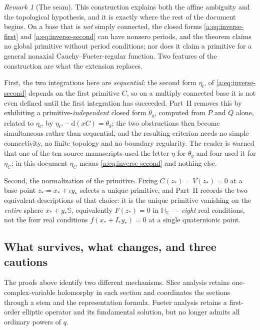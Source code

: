 \documentclass[11pt,a4paper]{article}
\numberwithin{equation}{section}
\theoremstyle{definition}
\theoremstyle{remark}
\newtheorem{remark}[theorem]{Remark}
\theoremstyle{plain}
\newcommand{\HC}{\mathbb H_{\mathbb C}}
\newcommand{\SSS}{\mathbb S}
\newcommand{\thet}{\theta}
\newcommand{\etaC}{\eta_{C}}
\newcommand{\pot}{C}          %
\newcommand{\potV}{V}         %
\newcommand{\dd}{\mathrm d}
\begin{document}
\begin{remark}[The seam]
\label{a:rem:seam}
This construction explains both the affine ambiguity and the topological
hypothesis, and it is exactly where the rest of the document begins. On a
base that is \emph{not} simply connected, the closed forms
\eqref{a:eq:inverse-first} and \eqref{a:eq:inverse-second} can have nonzero
periods, and the theorem claims no global primitive without period conditions;
nor does it claim a primitive for a general nonaxial Cauchy--Fueter-regular
function. Two features of the construction are what the extension replaces.

First, the two integrations here are \emph{sequential}: the second form
$\etaC$ of \eqref{a:eq:inverse-second} depends on the first primitive $\pot$,
so on a multiply connected base it is not even defined until the first
integration has succeeded. Part~II removes this by exhibiting a
primitive-\emph{independent} closed form $\thet_g$, computed from $P$ and $Q$
alone, related to $\etaC$ by $\etaC-\dd(x\pot)=\thet_g$; the two obstructions
then become simultaneous rather than sequential, and the resulting criterion
needs no simple connectivity, no finite topology and no boundary regularity.
The reader is warned that one of the ten source manuscripts used the letter
$\eta$ for $\thet_g$ and four used it for $\etaC$; in this document $\etaC$
means \eqref{a:eq:inverse-second} and nothing else.

Second, the normalization of the primitive. Fixing $\pot(z_*)=\potV(z_*)=0$
at a base point $z_*=x_*+\iota y_*$ selects a unique primitive, and Part~II
records the two equivalent descriptions of that choice: it is the unique
primitive vanishing on the \emph{entire} sphere $x_*+y_*\SSS$, equivalently
$F(z_*)=0$ in $\HC$ --- \emph{eight} real conditions, not the four real
conditions $f(x_*+I_*y_*)=0$ at a single quaternionic point.
\end{remark}

\subsection{What survives, what changes, and three cautions}
\label{a:sec:comparison}

The proofs above identify two different mechanisms. Slice analysis retains
one-complex-variable holomorphy in each section and coordinates the sections
through a stem and the representation formula. Fueter analysis retains a
first-order elliptic operator and its fundamental solution, but no longer
admits all ordinary powers of $q$.
\end{document}
